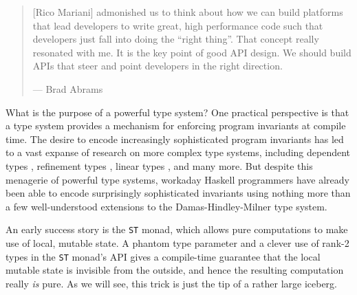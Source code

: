\documentclass[format=sigplan, review=false, screen=true]{acmart}
\makeatletter
\let\origsection\section
\renewcommand\section{\@ifstar{\starsection}{\nostarsection}}
\newcommand\nostarsection[1]
{\sectionprelude\origsection{#1}\sectionpostlude}
\newcommand\starsection[1]
{\sectionprelude\origsection*{#1}\sectionpostlude}
\newcommand\sectionprelude{%
  \vspace{-0.5em}
}
\newcommand\sectionpostlude{%
  \vspace{0em}
}
\makeatother
\begin{document}
%
%



\maketitle

\renewcommand{\shortauthors}{M. Noonan}

%

\section{Introduction}
\begin{quote}
  [Rico Mariani] admonished us to think about how we can build platforms that lead developers to write great, high performance code such that developers just fall into doing the ``right thing''. That concept really resonated with me. It is the key point of good API design. We should build APIs that steer and point developers in the right direction.
  
  \hfill --- Brad Abrams \cite{pitofsuccess}
\end{quote}

What is the purpose of a powerful type system? One practical perspective is
that a type system provides a mechanism for enforcing program
invariants at compile time. The desire to encode increasingly
sophisticated program invariants has led to a vast expanse of research
on more complex type systems, including dependent types \cite{augustsson1998cayenne,bove2009dependent}, refinement types \cite{freeman1991refinement}, linear
types \cite{wadler1990linear}, and many more. But despite this menagerie of powerful
type systems, workaday Haskell programmers have already been able to encode
surprisingly sophisticated invariants using nothing more than a
few well-understood extensions to the Damas-Hindley-Milner type system.

An early success story is the \texttt{ST} monad, which allows pure
computations to make use of local, mutable state. A phantom type parameter
and a clever use of rank-2 types in the \texttt{ST} monad's API gives
a compile-time guarantee that the local mutable state is invisible from the outside,
and hence the resulting computation really \emph{is} pure. As we will see, this
trick is just the tip of a rather large iceberg.
\end{document}
